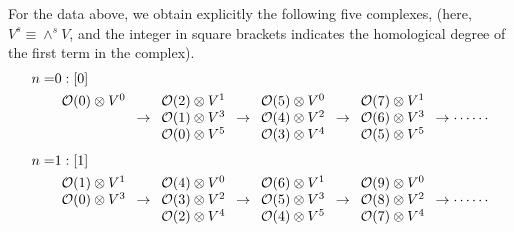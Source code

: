 For the data above, we obtain explicitly the following five complexes, 
(here, $V^s\equiv\wedge^s V$, and the integer in square brackets indicates the
homological degree of the first term in the complex).
\begin{equation}
\begin{split}
n=&0:[0]\\&
\begin{array}{c}
\calo(0)\otimes V^0\\
\phantom{\calo}
\\
\phantom{\calo}
\end{array}
\to
\begin{array}{c}
\calo(2)\otimes V^1\\
\calo(1)\otimes V^3 \\
\calo(0)\otimes V^5 
\end{array}
\to
\begin{array}{c}
\calo(5)\otimes V^0\\
\calo(4)\otimes V^2\\
\calo(3)\otimes V^4\\
\end{array}
\to
\begin{array}{c}
\calo(7)\otimes V^1\\
\calo(6)\otimes V^3 \\
\calo(5)\otimes V^5 
\end{array}
\to
\cdots\cdots 
\end{split}
\end{equation}
\begin{equation}
\begin{split}
n=&1:[1]\\&
\begin{array}{c}
\calo(1)\otimes V^1\\
\calo(0)\otimes V^3 \\
\phantom{\calo}
\end{array}
\to
\begin{array}{c}
\calo(4)\otimes V^0\\
\calo(3)\otimes V^2\\
\calo(2)\otimes V^4\\
\end{array}
\to
\begin{array}{c}
\calo(6)\otimes V^1\\
\calo(5)\otimes V^3 \\
\calo(4)\otimes V^5 
\end{array}
\to
\begin{array}{c}
\calo(9)\otimes V^0\\
\calo(8)\otimes V^2\\
\calo(7)\otimes V^4\\
\end{array}
\to \cdots\cdots\\
\end{split}
\end{equation}
